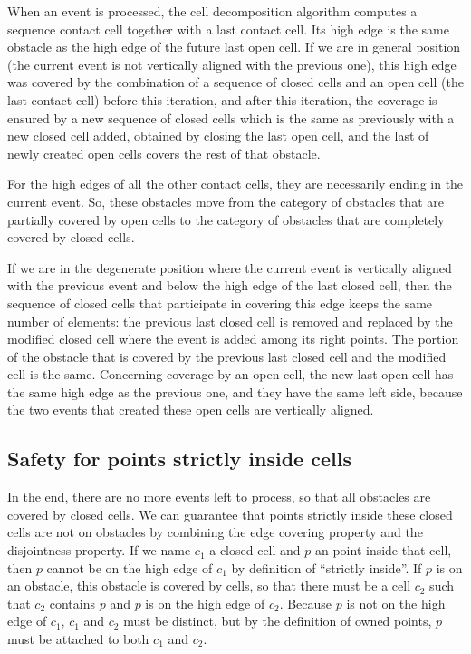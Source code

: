 \documentclass[a4paper, USenglish, cleveref, autoref, thm-restate, final]{lipics-v2021}
\begin{document}
When an event is processed, the cell decomposition algorithm computes
a sequence contact cell together with a last contact cell.  Its high edge
is the same obstacle as the high edge of the future last open cell.  If we
are in general position (the current event is not vertically aligned
with the previous one), this high
edge was covered by the combination of a sequence of closed cells and
an open cell (the last contact cell) before this iteration,
and after this iteration, the coverage is ensured by a new sequence
of closed cells which is the same as previously with a new closed cell added,
obtained by closing the last open cell, and the last of newly created open
cells covers the rest of that obstacle.

For the high edges of all the other contact cells, they are
necessarily ending in the current event.  So, these obstacles move from
the category of obstacles that are partially covered by open cells to
the category of obstacles that are completely covered by closed cells.

If we are in the degenerate position where the current event is
vertically aligned with the previous event and below the high edge of the
last closed cell, then the sequence of closed cells that participate
in covering this edge keeps the same number of elements: the previous last
closed cell is removed and replaced by the modified closed cell
where the event is added among its right points.  The portion of the
obstacle that is covered by the previous last closed cell and the
modified cell is the same.  Concerning coverage by an open cell, the
new last open cell has the same high edge as the previous one, and
they have the same left side, because the two events that created
these open cells are vertically aligned.
\subsection{Safety for points strictly inside cells}
In the end, there are no more events left to process, so that all
obstacles are covered by closed cells.  
We can guarantee that points strictly inside these closed cells are not
on obstacles by combining the edge covering property and the
disjointness property.  If we name \(c_1\) a closed cell and \(p\) an
point inside that cell, then \(p\) cannot be on the high edge of
\(c_1\) by definition of ``strictly inside''.  If \(p\) is on an
obstacle, this obstacle is covered by cells, so that there must be a
cell \(c_2\) such that \(c_2\) contains \(p\) and \(p\) is on the high
edge of \(c_2\).  Because \(p\) is not on the high edge of \(c_1\),
\(c_1\) and \(c_2\) must be distinct, but by the definition of
owned points, \(p\) must be attached to both \(c_1\) and \(c_2\).
\end{document}
